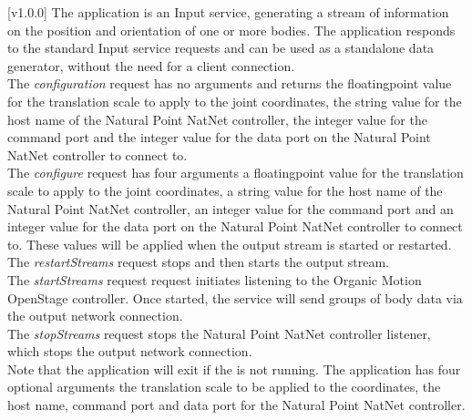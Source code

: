 [v1.0.0]
The  application is an Input service,
generating a stream of information on the position and orientation of one or more bodies.
The application responds to the standard Input service requests and can be used as a
standalone data generator, without the need for a client connection.\\

The \emph{configuration} request has no arguments and returns the floating\longDash{}point
value for the translation scale to apply to the joint coordinates, the string value for
the host name of the Natural Point NatNet controller, the integer value for the command
port and the integer value for the data port on the Natural Point NatNet controller to
connect to.\\

The \emph{configure} request has four arguments \longDash{} a floating\longDash{}point
value for the translation scale to apply to the joint coordinates, a string value for
the host name of the Natural Point NatNet controller, an integer value for the command
port and an integer value for the data port on the Natural Point NatNet controller to
connect to.
These values will be applied when the output stream is started or restarted.\\ 

The \emph{restartStreams} request stops and then starts the output stream.\\

The \emph{startStreams} request request initiates listening to the Organic Motion
OpenStage controller.
Once started, the service will send groups of body data via the output \yarp{} network
connection.\\

The \emph{stopStreams} request stops the Natural Point NatNet controller listener, which
stops the output \yarp{} network connection.\\ 

Note that the application will exit if the \emph{\RS} is not running.
The application has four optional arguments \longDash{} the translation scale to be
applied to the coordinates, the host name, command port and data port for the Natural
Point NatNet controller.
\insertAppParameters
\insertTagDescription{\NNBI}
\insertInputServiceComment\\

